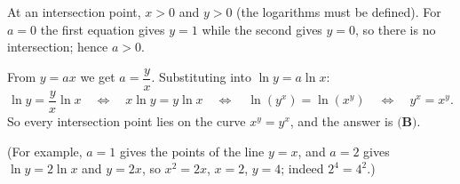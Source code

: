 At an intersection point, $x>0$ and $y>0$ (the logarithms must be defined). For $a=0$ the first equation gives $y=1$ while the second gives $y=0$, so there is no intersection; hence $a>0$.

From $y=ax$ we get $a=\dfrac{y}{x}$. Substituting into $\ln y=a\ln x$:
\[\ln y=\dfrac{y}{x}\ln x\quad\Longleftrightarrow\quad x\ln y=y\ln x\quad\Longleftrightarrow\quad \ln\left(y^x\right)=\ln\left(x^y\right)\quad\Longleftrightarrow\quad y^x=x^y.\]
So every intersection point lies on the curve $x^y=y^x$, and the answer is $\boxed{\textbf{(B)}}$.

(For example, $a=1$ gives the points of the line $y=x$, and $a=2$ gives $\ln y=2\ln x$ and $y=2x$, so $x^2=2x$, $x=2$, $y=4$; indeed $2^4=4^2$.)
